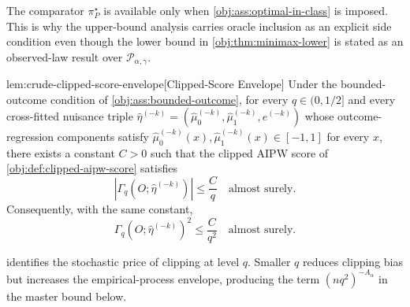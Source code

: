 The comparator \(\pi^\star_P\) is available only when \cref{obj:ass:optimal-in-class} is imposed.  This is why the upper-bound analysis carries oracle inclusion as an explicit side condition even though the lower bound in \cref{obj:thm:minimax-lower} is stated as an observed-law result over \(\mathcal P_{\alpha,\gamma}\).

\begin{lemmav}{lem:crude-clipped-score-envelope}[Clipped-Score Envelope]
Under the bounded-outcome condition of \cref{obj:ass:bounded-outcome}, for every \(q\in(0,1/2]\) and every cross-fitted nuisance triple \(\widehat\eta^{(-k)}=(\widehat\mu_0^{(-k)},\widehat\mu_1^{(-k)},\widehat e^{(-k)})\) whose outcome-regression components satisfy \(\widehat\mu_0^{(-k)}(x),\widehat\mu_1^{(-k)}(x)\in[-1,1]\) for every \(x\), there exists a constant \(C>0\) such that the clipped AIPW score of \cref{obj:def:clipped-aipw-score} satisfies
\[
\left|\Gamma_q\!\left(O;\widehat\eta^{(-k)}\right)\right|\le \frac{C}{q}
\quad\text{almost surely}.
\]
Consequently, with the same constant,
\[
\Gamma_q\!\left(O;\widehat\eta^{(-k)}\right)^2
\le \frac{C}{q^2}
\quad\text{almost surely}.
\]
\end{lemmav}

 identifies the stochastic price of clipping at level \(q\).  Smaller \(q\) reduces clipping bias but increases the empirical-process envelope, producing the term \((nq^2)^{-A_\alpha}\) in the master bound below.


